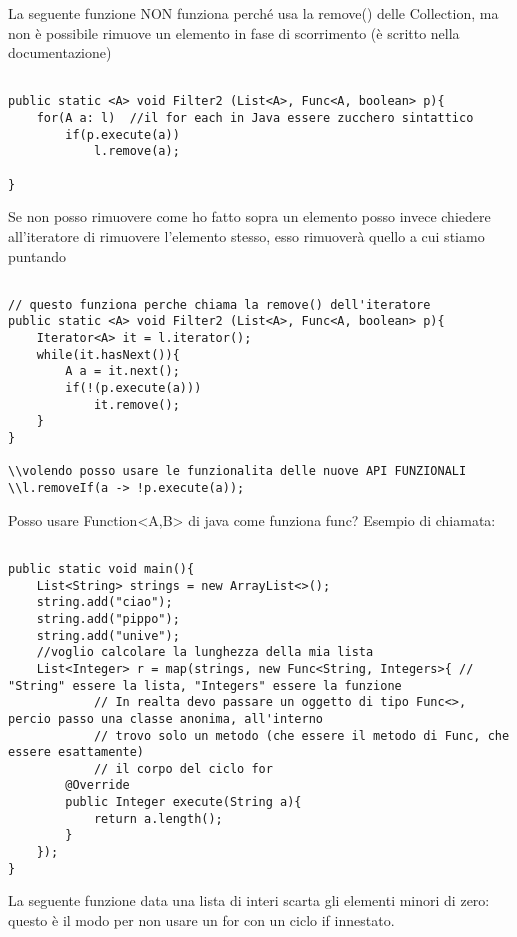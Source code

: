 \noindent La seguente funzione NON funziona perché usa la remove() delle Collection, ma non è possibile rimuove un elemento in fase di scorrimento (è scritto nella documentazione)

\begin{lstlisting}[basicstyle=\small,]

public static <A> void Filter2 (List<A>, Func<A, boolean> p){
	for(A a: l)  //il for each in Java essere zucchero sintattico
		if(p.execute(a))
			l.remove(a);

}

\end{lstlisting}
Se non posso rimuovere come ho fatto sopra un elemento posso invece chiedere all'iteratore di rimuovere l'elemento stesso, esso rimuoverà quello a cui stiamo puntando

\begin{lstlisting}[basicstyle=\small,]

// questo funziona perche chiama la remove() dell'iteratore
public static <A> void Filter2 (List<A>, Func<A, boolean> p){
	Iterator<A> it = l.iterator();
	while(it.hasNext()){
		A a = it.next();
		if(!(p.execute(a)))
			it.remove();
	}
}

\\volendo posso usare le funzionalita delle nuove API FUNZIONALI
\\l.removeIf(a -> !p.execute(a));
\end{lstlisting}

\noindent Posso usare Function<A,B> di java come funziona func? \newline
Esempio di chiamata:

\begin{lstlisting}[basicstyle=\small,]

public static void main(){
	List<String> strings = new ArrayList<>();
	string.add("ciao");
	string.add("pippo");
	string.add("unive");
	//voglio calcolare la lunghezza della mia lista
	List<Integer> r = map(strings, new Func<String, Integers>{ // "String" essere la lista, "Integers" essere la funzione
            // In realta devo passare un oggetto di tipo Func<>, percio passo una classe anonima, all'interno 
            // trovo solo un metodo (che essere il metodo di Func, che essere esattamente)
            // il corpo del ciclo for	
		@Override 
		public Integer execute(String a){
			return a.length();
		}	
	});
}
\end{lstlisting}


\noindent La seguente funzione data una lista di interi scarta gli elementi minori di zero: questo è il modo per non usare un for con un ciclo if innestato.

